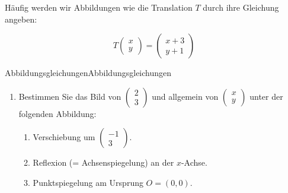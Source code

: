 Häufig werden wir Abbildungen wie die Translation \( T \) durch ihre Gleichung angeben:

\[
T \begin{pmatrix} x \\ y \end{pmatrix} = \begin{pmatrix} x+3 \\ y+1 \end{pmatrix}
\]

\begin{LA}
{Abbildungsgleichungen}{Abbildungsgleichungen}
\begin{enumerate}
    \item Bestimmen Sie das Bild von \( \begin{pmatrix} 2 \\ 3 \end{pmatrix} \) und allgemein von \( \begin{pmatrix} x \\ y \end{pmatrix} \) unter der folgenden Abbildung:

\begin{enumerate}
    \item Verschiebung um \( \begin{pmatrix} -1 \\ 3 \end{pmatrix} \).

    \item Reflexion (= Achsenspiegelung) an der $x$-Achse.

    \item Punktspiegelung am Ursprung \( O = (0,0) \).


\end{enumerate}
\end{enumerate}
\end{LA}
